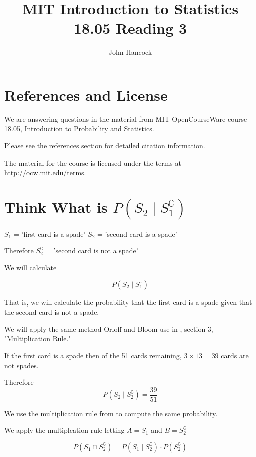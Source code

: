 \documentclass[a4paper,11pt]{article}
\author{John Hancock}
\title{MIT Introduction to Statistics 18.05 Reading 3}
\begin{document}
\maketitle
\tableofcontents
\section{References and License}
We are answering questions in the material from MIT OpenCourseWare
course 18.05, Introduction to Probability and Statistics.

Please see the references section for detailed citation information.

The material for the course is licensed under the terms at 
\url{http://ocw.mit.edu/terms}.

\section{Think What is $P\left(S_{2} \mid S_{1}^{\complement}\right)$}

$S_{1}$ = 'first card is a spade'
$S_{2}$ = 'second card is a spade'

Therefore $S_{2}^{\complement}$  = 'second card is not a spade'

We will calculate

\begin{equation}
  P\left(S_{2} \mid S_{1}^{\complement}\right)
\end{equation}

That is, we will calculate the probability that the first card is a
spade given that the second card is not a spade.

We will apply the same method Orloff and Bloom use in \cite{reading3}, 
section 3, "Multiplication Rule."

If the first card is a spade then of the 51 cards remaining, 
$3 \times 13 = 39$ cards are not spades.

Therefore 
\begin{equation} \label{s1S2Condish}
  P\left(S_{2} \mid S_{2}^{\complement}\right) = \frac{39}{51}
\end{equation}

We use the multiplication rule from \cite{reading3} 
to compute the same probability.

We apply the multiplcation rule letting $A=S_{1}$ and $B=S_{2}^{\complement}$

\begin{equation} \label{multRule}
  P\left(S_{1} \cap S_{2}^{\complement}\right) =
  P\left(S_{1} \mid S_{2}^{\complement}\right) \cdot 
  P\left(S_{2}^{\complement}\right)
\end{equation}
\end{document}
